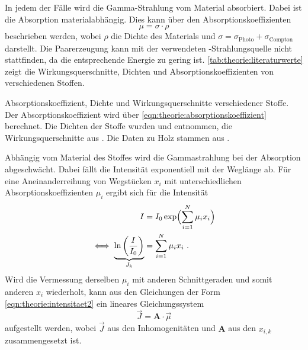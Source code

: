     In jedem der Fälle wird die Gamma-Strahlung vom Material absorbiert.
    Dabei ist die Absorption materialabhängig.
    Dies kann über den Absorptionskoeffizienten
    \begin{equation}
        \mu = \sigma \cdot \rho
        \label{eqn:theorie:absorptionskoeffizient}
    \end{equation}
    beschrieben werden,
    wobei $\rho$ die Dichte des Materials und $\sigma = \sigma_\text{Photo} + \sigma_\text{Compton}$ darstellt.
    Die Paarerzeugung kann mit der verwendeten -Strahlungsquelle nicht stattfinden,
    da die entsprechende Energie zu gering ist.
    \autoref{tab:theorie:literaturwerte} zeigt die Wirkungsquerschnitte,
    Dichten und Absorptionskoeffizienten von verschiedenen Stoffen.
    \begin{table}[H]
        \centering
        \caption{Absorptionskoeffizient, Dichte und Wirkungsquerschnitte verschiedener Stoffe.
        Der Absorptionskoeffizient wird über \autoref{eqn:theorie:absorptionskoeffizient} berechnet.
        Die Dichten der Stoffe wurden \cite{dichten} und \cite{dichte_delrin} entnommen,
        die Wirkungsquerschnitte aus \cite{crosssections}.
        Die Daten zu Holz stammen aus \cite{holz}.}
        \label{tab:theorie:literaturwerte}
    \end{table}
    Abhängig vom Material des Stoffes wird die Gammastrahlung bei der Absorption abgeschwächt.
    Dabei fällt die Intensität exponentiell mit der Weglänge ab.
    Für eine Aneinanderreihung von Wegstücken $x_i$
    mit unterschiedlichen Absorptionskoeffizienten $\mu_i$
    ergibt sich für die Intensität
    \begin{align}
        I &= I_0 \exp\Bigl(\sum_{i=1}^N \mu_i x_i \Bigr) \\
        \iff \underbrace{ \ln\left(\frac{I}{I_0}\right) }_{J_k} &= \sum_{i=1}^N \mu_i x_i \ .
        \label{eqn:theorie:intensitaet2}
    \end{align}
    Wird die Vermessung derselben $\mu_i$ mit anderen Schnittgeraden und somit anderen $x_i$ wiederholt,
    kann aus den Gleichungen der Form \eqref{eqn:theorie:intensitaet2} ein lineares Gleichungssystem
    \begin{equation}
        \vec{J} = \symbf{A} \cdot \vec{\mu}
    \end{equation}
    aufgestellt werden,
    wobei $\vec{J}$ aus den Inhomogenitäten
    und $\symbf{A}$ aus den $x_{i,k}$
    zusammengesetzt ist.

